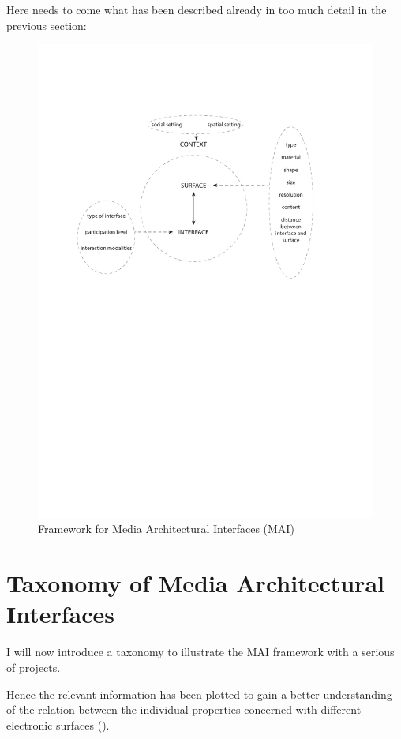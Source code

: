 Here needs to come what has been described already in too much detail in the previous section:

\begin{figure}[htp]
\centering
\includegraphics[width=\textwidth]{Illustrations/MAI_Framework.pdf}
\caption{Framework for Media Architectural Interfaces (MAI)}
\label{fig:MAI_Framework}
\end{figure}

\section{Taxonomy of Media Architectural Interfaces}

I will now introduce a taxonomy to illustrate the MAI framework with a serious of projects. 

Hence the relevant information has been plotted to gain a better understanding of the relation between the individual properties concerned with different electronic surfaces (\label{fig:CCN_Taxonomy}).

